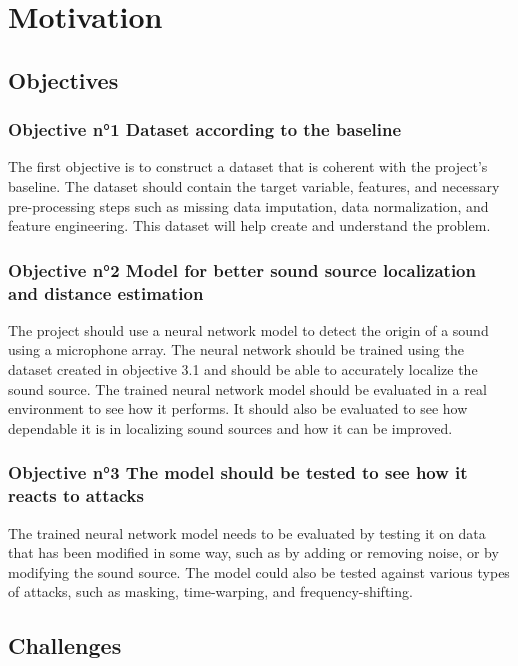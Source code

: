 \section{Motivation}
\label{intro:motivation}

\subsection{Objectives}

\subsubsection{Objective n°1 Dataset according to the baseline}

The first objective is to construct a dataset that is coherent with the project's baseline. The dataset should contain the target variable, features, and necessary pre-processing steps such as missing data imputation, data normalization, and feature engineering. This dataset will help create and understand the problem.

\subsubsection{Objective n°2 Model for better sound source localization and distance estimation}

The project should use a neural network model to detect the origin of a sound using a microphone array. The neural network should be trained using the dataset created in objective 3.1 and should be able to accurately localize the sound source. The trained neural network model should be evaluated in a real environment to see how it performs. It should also be evaluated to see how dependable it is in localizing sound sources and how it can be improved.

\subsubsection{Objective n°3 The model should be tested to see how it reacts to attacks}

The trained neural network model needs to be evaluated by testing it on data that has been modified in some way, such as by adding or removing noise, or by modifying the sound source. The model could also be tested against various types of attacks, such as masking, time-warping, and frequency-shifting.

\subsection{Challenges}
\label{intro:challenges}

